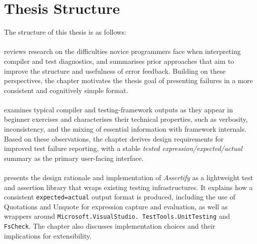 \section{Thesis Structure} %
  \label{Thesis Structure} %


\improve


The structure of this thesis is as follows:


\paragraph{}
    \label{Thesis Structure: Background and Related Work}
reviews research on the difficulties novice programmers face when interpreting compiler and test
diagnostics, and summarises prior approaches that aim to improve the structure and usefulness of
error feedback. Building on these perspectives, the chapter motivates the thesis goal of presenting
failures in a more consistent and cognitively simple format.


\paragraph{}
    \label{Thesis Structure: Problem Analysis}
examines typical compiler and testing-framework outputs as they appear in beginner exercises and
characterises their technical properties, such as verbosity, inconsistency, and the mixing of
essential information with framework internals. Based on these observations, the chapter derives
design requirements for improved test failure reporting, with a stable
\emph{tested expression/expected/actual} summary as the primary user-facing interface.


\paragraph{}
    \label{Thesis Structure: Assertify (and Checkify): Design and Implementation}
presents the design rationale and implementation of \emph{Assertify} as a lightweight test and
assertion library that wraps existing testing infrastructures. It explains how a consistent
\texttt{expected=actual} output format is produced, including the use of Quotations and Unquote for
expression capture and evaluation, as well as wrappers around \texttt{Microsoft.VisualStudio.
TestTools.UnitTesting} and \texttt{FsCheck}. The chapter also discusses implementation choices and
their implications for extensibility.


